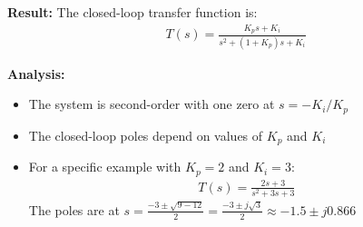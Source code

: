 \documentclass[11pt,a4paper]{article}
\begin{document}
\textbf{Result:} The closed-loop transfer function is:
\begin{align}
  T(s) = \frac{K_ps + K_i}{s^2 + (1+K_p)s + K_i}
\end{align}

\textbf{Analysis:}
\begin{itemize}
  \item The system is second-order with one zero at $s = -K_i/K_p$
  \item The closed-loop poles depend on values of $K_p$ and $K_i$
  \item For a specific example with $K_p = 2$ and $K_i = 3$:
    \begin{align}
      T(s) = \frac{2s + 3}{s^2 + 3s + 3}
    \end{align}
    The poles are at $s = \frac{-3 \pm \sqrt{9-12}}{2} = \frac{-3 \pm j\sqrt{3}}{2} \approx -1.5 \pm j0.866$
\end{itemize}
\end{document}
